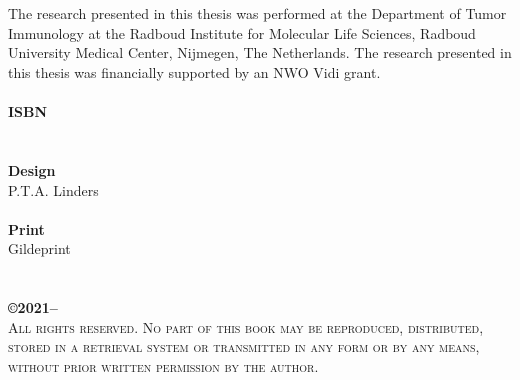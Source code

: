 \setcounter{page}{1}


\newpage
\thispagestyle{empty}
\vspace{120pt}
\noindent \\
\noindent \\
\noindent \Huge \textbf{\thetitle} \\
\noindent \\
\noindent \\
\noindent \\
\noindent \Large \theauthor\\
\newpage
\rm

\newpage
\thispagestyle{empty}
\vspace*{\fill}
\noindent \small The research presented in this thesis was performed at the Department of Tumor Immunology at the Radboud Institute for Molecular Life Sciences, Radboud University Medical Center, Nijmegen, The Netherlands. The research presented in this thesis was financially supported by an NWO Vidi grant. \\
\noindent \\
\noindent \textbf{ISBN} \\
 \\
\noindent \\
\noindent \textbf{Design} \\
\noindent P.T.A. Linders \\
\noindent \\
\noindent \textbf{Print} \\
\noindent Gildeprint \\
\noindent \\
\noindent \\
\scshape \noindent \small \textbf{\copyright \small 2021\hspace{3pt}-- \theauthor} \\
\noindent All rights reserved. No part of this book may be reproduced, distributed, stored in a retrieval system or transmitted in any form or by any means, without prior written permission by the author. \\
\newpage
\rm

